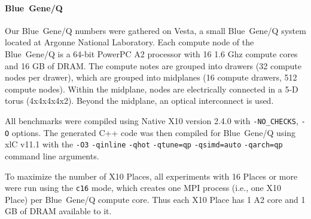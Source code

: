 \paragraph{Blue~Gene/Q}
Our Blue~Gene/Q numbers were gathered on Vesta, a small Blue~Gene/Q
system located at Argonne National Laboratory.
Each compute node of the
Blue~Gene/Q is a 64-bit PowerPC A2 processor with 16 1.6 Ghz compute
cores and 16 GB of DRAM. The compute notes are grouped into drawers
(32 compute nodes per drawer), which are grouped into midplanes (16
compute drawers, 512 compute nodes).  Within the midplane, nodes are
electrically connected in a 5-D torus (4x4x4x4x2). Beyond the
midplane, an optical interconnect is used.  

All benchmarks were compiled using Native X10 version 2.4.0 with \texttt{-NO\_CHECKS}, \texttt{-O} options. The
generated C++ code was then compiled for Blue~Gene/Q using xlC v11.1
with
the \texttt{-O3} \texttt{-qinline} \texttt{-qhot} \texttt{-qtune=qp} \texttt{-qsimd=auto} \texttt{-qarch=qp}
command line arguments.

To maximize the number of X10 Places, all experiments with 16 Places or
more were run using the \texttt{c16} mode, which creates one MPI
process (i.e., one X10 Place) per Blue~Gene/Q compute core.  Thus each
X10 Place has 1 A2 core and 1 GB of DRAM available to it.  
